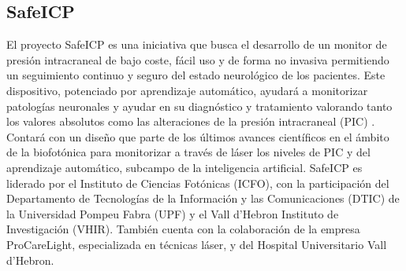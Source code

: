 \subsection{SafeICP \cite{safeicp}}
El proyecto SafeICP es una iniciativa que busca el desarrollo de un monitor de presión intracraneal de bajo coste, fácil uso y de forma no invasiva permitiendo un seguimiento continuo y seguro del estado neurológico de los pacientes. Este dispositivo, potenciado por aprendizaje automático, ayudará a monitorizar patologías neuronales y ayudar en su diagnóstico y tratamiento valorando tanto los valores absolutos como las alteraciones de la presión intracraneal (PIC) \cite{safe}. Contará con un diseño que parte de los últimos avances científicos en el ámbito de la biofotónica para monitorizar a través de láser los niveles de PIC y del aprendizaje automático, subcampo de la inteligencia artificial. 
SafeICP es liderado por el Instituto de Ciencias Fotónicas (ICFO), con la participación  del Departamento de Tecnologías de la Información y las Comunicaciones (DTIC) de la Universidad Pompeu Fabra (UPF) y el Vall d’Hebron Instituto de Investigación (VHIR). También cuenta con la colaboración de la empresa ProCareLight, especializada en técnicas láser, y del Hospital Universitario Vall d’Hebron.

